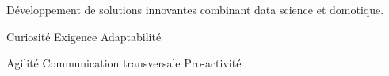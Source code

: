 \documentclass[10pt,a4paper,ragged2e,withhyper]{altacv}
\begin{document}
\begin{paracol}{2}
Développement de solutions innovantes combinant data science et  domotique.

{\faLightbulb} Curiosité
{\faBalanceScale} Exigence
{\faWind} Adaptabilité

\divider

{\faPuzzlePiece} Agilité
{\faComments} Communication transversale
{\faRocket} Pro-activité



\end{paracol}
\end{document}
